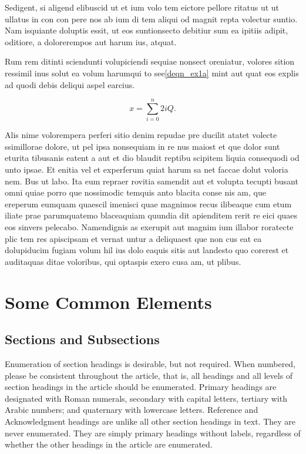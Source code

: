 \documentclass[lettersize,journal]{IEEEtran}
\begin{document}
Sedigent, si aligend elibuscid ut et ium volo tem eictore pellore ritatus ut ut ullatus in con con pere nos ab ium di tem aliqui od magnit repta volectur suntio. Nam isquiante doluptis essit, ut eos suntionsecto debitiur sum ea ipitiis adipit, oditiore, a dolorerempos aut harum ius, atquat.

Rum rem ditinti sciendunti volupiciendi sequiae nonsect oreniatur, volores sition ressimil inus solut ea volum harumqui to see\eqref{deqn_ex1a} mint aut quat eos explis ad quodi debis deliqui aspel earcius.

\begin{equation}
\label{deqn_ex1a}
x = \sum_{i=0}^{n} 2{i} Q.
\end{equation}

Alis nime volorempera perferi sitio denim repudae pre ducilit atatet volecte ssimillorae dolore, ut pel ipsa nonsequiam in re nus maiost et que dolor sunt eturita tibusanis eatent a aut et dio blaudit reptibu scipitem liquia consequodi od unto ipsae. Et enitia vel et experferum quiat harum sa net faccae dolut voloria nem. Bus ut labo. Ita eum repraer rovitia samendit aut et volupta tecupti busant omni quiae porro que nossimodic temquis anto blacita conse nis am, que ereperum eumquam quaescil imenisci quae magnimos recus ilibeaque cum etum iliate prae parumquatemo blaceaquiam quundia dit apienditem rerit re eici quaes eos sinvers pelecabo. Namendignis as exerupit aut magnim ium illabor roratecte plic tem res apiscipsam et vernat untur a deliquaest que non cus eat ea dolupiducim fugiam volum hil ius dolo eaquis sitis aut landesto quo corerest et auditaquas ditae voloribus, qui optaspis exero cusa am, ut plibus.


\section{Some Common Elements}
\subsection{Sections and Subsections}
Enumeration of section headings is desirable, but not required. When numbered, please be consistent throughout the article, that is, all headings and all levels of section headings in the article should be enumerated. Primary headings are designated with Roman numerals, secondary with capital letters, tertiary with Arabic numbers; and quaternary with lowercase letters. Reference and Acknowledgment headings are unlike all other section headings in text. They are never enumerated. They are simply primary headings without labels, regardless of whether the other headings in the article are enumerated. 
\end{document}
